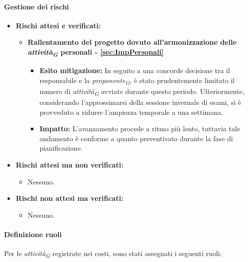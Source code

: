 \paragraph{Gestione dei rischi} 
\begin{itemize}
    \item \textbf{Rischi attesi e verificati:}
\begin{itemize}
    \item \textbf{Rallentamento del progetto dovuto all’armonizzazione delle \textit{attività}\textsubscript{\textit{G}} personali - \ref{sec:ImpPersonali}}
    \begin{itemize}
        \item \textbf{Esito mitigazione:} 
        In seguito a una concorde decisione tra il responsabile e la \textit{proponente}\textsubscript{\textit{G}}, è stato prudentemente limitato il numero di \textit{attività}\textsubscript{\textit{G}} avviate durante questo periodo. Ulteriormente, considerando l'approssimarsi della sessione invernale di esami, si è provveduto a ridurre l'ampiezza temporale a una settimana.
        \item \textbf{Impatto:}
        L'avanzamento procede a ritmo più lento, tuttavia tale andamento è conforme a quanto preventivato durante la fase di pianificazione.
    \end{itemize}
\end{itemize}
\item \textbf{Rischi attesi ma non verificati:}
 \begin{itemize}
    \item Nessuno.
\end{itemize}
\item \textbf{Rischi non attesi ma verificati:}
\begin{itemize}
    \item Nessuno.
\end{itemize}
\end{itemize}

\paragraph{Definizione ruoli} \hspace{1pt}
Per le \textit{attività}\textsubscript{\textit{G}} registrate nei costi, sono stati assegnati i seguenti ruoli:

